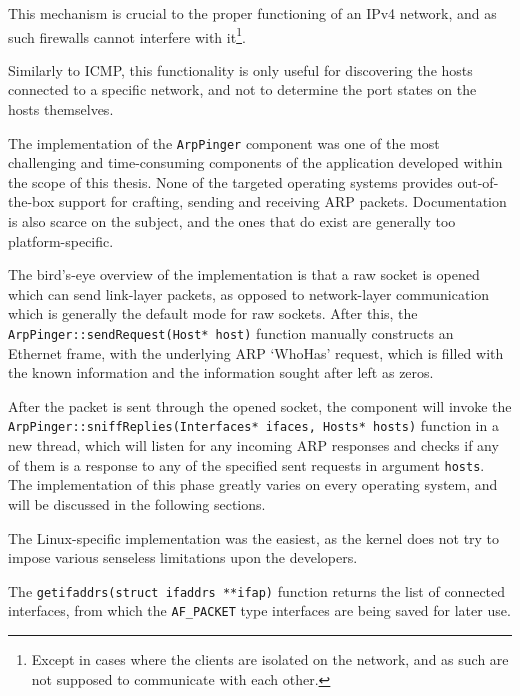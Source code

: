 \documentclass[a4paper,12pt]{article}
\begin{document}
	This mechanism is crucial to the proper functioning of an IPv4 network, and as such firewalls cannot interfere with it\footnote{Except in cases where the clients are isolated on the network, and as such are not supposed to communicate with each other.}.
	
	Similarly to ICMP, this functionality is only useful for discovering the hosts connected to a specific network, and not to determine the port states on the hosts themselves.
	
 

	The implementation of the \texttt{ArpPinger} component was one of the most challenging and time-consuming components of the application developed within the scope of this thesis. None of the targeted operating systems provides out-of-the-box support for crafting, sending and receiving ARP packets. Documentation is also scarce on the subject, and the ones that do exist are generally too platform-specific.
	
	The bird's-eye overview of the implementation is that a raw socket is opened which can send link-layer packets, as opposed to network-layer communication which is generally the default mode for raw sockets. After this, the \texttt{ArpPinger::sendRequest(Host* host)} function manually constructs an Ethernet frame, with the underlying ARP `WhoHas' request, which is filled with the known information and the information sought after left as zeros.

	After the packet is sent through the opened socket, the component will invoke the \texttt{ArpPinger::sniffReplies(Interfaces* ifaces, Hosts* hosts)} function in a new thread, which will listen for any incoming ARP responses and checks if any of them is a response to any of the specified sent requests in argument \texttt{hosts}. The implementation of this phase greatly varies on every operating system, and will be discussed in the following sections.

 

	The Linux-specific implementation was the easiest, as the kernel does not try to impose various senseless limitations upon the developers.
	
	The \texttt{getifaddrs(struct ifaddrs **ifap)} function returns the list of connected interfaces, from which the \texttt{AF_PACKET} type interfaces are being saved for later use.
\end{document}
